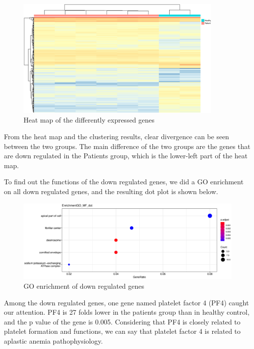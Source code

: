 \begin{figure}[H]
    \centering
    \includegraphics[width=0.9\textwidth]{image/HMCD3.eps}
    \caption{Heat map of the differently expressed genes}
    \label{HMCD3}
\end{figure}

From the heat map and the clustering results, clear divergence can be seen between the two groups. The main difference of the two groups are the genes that are down regulated in the Patients group, which is the lower-left part of the heat map.

To find out the functions of the down regulated genes, we did a GO enrichment on all down regulated genes, and the resulting dot plot is shown below.

\begin{figure}[H]
    \centering
    \includegraphics[width=1\textwidth]{image/EGOCD3.eps}
    \caption{GO enrichment of down regulated genes}
    \label{HMCD3}
\end{figure}

Among the down regulated genes, one gene named platelet factor 4 (PF4) caught our attention. PF4 is 27 folds lower in the patients group than in healthy control, and the p value of the gene is 0.005. Considering that PF4 is closely related to platelet formation and functions, we can say that platelet factor 4 is related to aplastic anemia pathophysiology.

